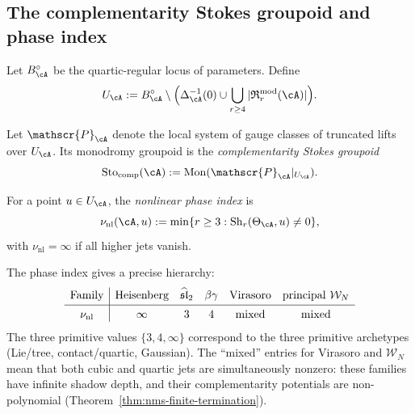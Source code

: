 \subsection{The complementarity Stokes groupoid and phase index}
\label{subsec:stokes-groupoid-phase-index}

\begin{definition}
\label{def:nonlinear-regular-locus}
Let $B^{\circ}_{\cA}$ be the quartic-regular locus of parameters.
Define
\begin{equation}
\label{eq:nonlinear-regular-locus}
U_{\cA}
:=
B^{\circ}_{\cA} \setminus
\Bigl(
\Delta_{\cA}^{-1}(0)
\cup
\bigcup_{r \geq 4}
|\mathfrak{R}^{\mathrm{mod}}_r(\cA)|
\Bigr).
\end{equation}
\end{definition}

\begin{definition}
\label{def:complementarity-stokes-groupoid}
Let $\mathscr{P}_{\cA}$ denote the local system of gauge classes
of truncated lifts over $U_{\cA}$. Its monodromy groupoid is the
\emph{complementarity Stokes groupoid}
\begin{equation}
\label{eq:complementarity-stokes-groupoid}
\operatorname{Sto}_{\mathrm{comp}}(\cA)
:=
\operatorname{Mon}(\mathscr{P}_{\cA}|_{U_{\cA}}).
\end{equation}
\end{definition}

\begin{definition}
\label{def:phase-index}
For a point $u \in U_{\cA}$, the \emph{nonlinear phase index} is
\begin{equation}
\label{eq:phase-index}
\nu_{\mathrm{nl}}(\cA, u)
:=
\min\{r \geq 3 : \operatorname{Sh}_r(\Theta_{\cA}, u) \neq 0\},
\end{equation}
with $\nu_{\mathrm{nl}} = \infty$ if all higher jets vanish.
\end{definition}

\begin{remark}
\label{rem:phase-index-families}
The phase index gives a precise hierarchy:
\[
\begin{array}{c|ccccc}
\text{Family}
& \text{Heisenberg}
& \widehat{\mathfrak{sl}}_2
& \beta\gamma
& \text{Virasoro}
& \text{principal }\mathcal{W}_N
\\[2pt]\hline\rule{0pt}{11pt}
\nu_{\mathrm{nl}}
& \infty
& 3
& 4
& \text{mixed}
& \text{mixed}
\end{array}
\]
The three primitive values $\{3, 4, \infty\}$ correspond to the three
primitive archetypes (Lie/tree, contact/quartic, Gaussian). The
``mixed'' entries for Virasoro and $\mathcal{W}_N$ mean that both
cubic and quartic jets are simultaneously nonzero: these families
have infinite shadow depth, and their
complementarity potentials are non-polynomial
(Theorem~\ref{thm:nms-finite-termination}).
\end{remark}

